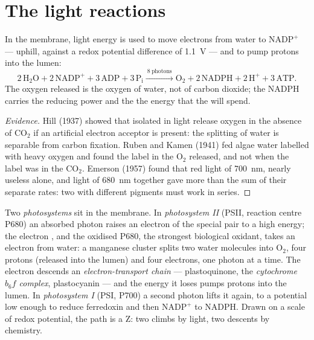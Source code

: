 \section{The light reactions}

\begin{proposition}\label{prop:b1:photosynthesis:lightreactions}
In the  membrane, light energy is used to move electrons from
water to $\mathrm{NADP^+}$ --- uphill, against a redox potential
difference of \qty{1.1}{V} --- and to pump protons into the lumen:
\[
2\,\mathrm{H_2O} + 2\,\mathrm{NADP^+} + 3\,\mathrm{ADP} + 3\,\mathrm{P_i}
\xrightarrow{\ 8\ \text{photons}\ }
\mathrm{O_2} + 2\,\mathrm{NADPH} + 2\,\mathrm{H^+} + 3\,\mathrm{ATP} .
\]
The oxygen released is the oxygen of water, not of carbon dioxide;
the NADPH carries the reducing power and the  the energy that the
 will spend.
\end{proposition}
\begin{proof}[Evidence]
Hill (1937) showed that isolated  in light release oxygen
in the absence of $\mathrm{CO_2}$ if an artificial electron acceptor
is present: the splitting of water is separable from carbon fixation.
Ruben and Kamen (1941) fed algae water labelled with heavy oxygen and
found the label in the $\mathrm{O_2}$ released, and not when the label
was in the $\mathrm{CO_2}$. Emerson (1957) found that red light of
\qty{700}{nm}, nearly useless alone, and light of \qty{680}{nm}
together gave more than the sum of their separate rates: two
 with different pigments must work in series.
\end{proof}

\begin{definition}\label{def:b1:photosynthesis:zscheme}
Two \emph{photosystems} sit in the  membrane. In
\emph{photosystem II} (PSII, reaction centre P680) an absorbed photon
raises an electron of the special pair to a high energy; the electron
, and the oxidised P680, the strongest biological oxidant,
takes an electron from water: a manganese cluster splits two water
molecules into $\mathrm{O_2}$, four protons (released into the lumen)
and four electrons, one photon at a time. The electron descends an
\emph{electron-transport chain} --- plastoquinone, the
\emph{cytochrome $b_6f$ complex}, plastocyanin --- and the energy it
loses pumps protons into the lumen. In \emph{photosystem I} (PSI,
P700) a second photon lifts it again, to a potential low enough to
reduce ferredoxin and then $\mathrm{NADP^+}$ to NADPH. Drawn on a
scale of redox potential, the path is a Z: two climbs by light, two
descents by chemistry.
\end{definition}

